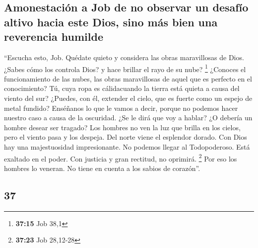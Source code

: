 \begin{paracol}{2}
\hypertarget{amonestaciuxf3n-a-job-de-no-observar-un-desafuxedo-altivo-hacia-este-dios-sino-muxe1s-bien-una-reverencia-humilde}{%
\subsection{Amonestación a Job de no observar un desafío altivo hacia
este Dios, sino más bien una reverencia
humilde}\label{amonestaciuxf3n-a-job-de-no-observar-un-desafuxedo-altivo-hacia-este-dios-sino-muxe1s-bien-una-reverencia-humilde}}

 ``Escucha esto, Job. Quédate quieto y considera las
obras maravillosas de Dios.  ¿Sabes cómo los controla
Dios? y hace brillar el rayo de su nube? \footnote{\textbf{37:15} Job
  38,1}  ¿Conoces el funcionamiento de las nubes, las
obras maravillosas de aquel que es perfecto en el conocimiento?
 Tú, cuya ropa es cálidacuando la tierra está quieta a
causa del viento del sur?  ¿Puedes, con él, extender el
cielo, que es fuerte como un espejo de metal fundido? 
Enséñanos lo que le vamos a decir, porque no podemos hacer nuestro caso
a causa de la oscuridad.  ¿Se le dirá que voy a hablar?
¿O debería un hombre desear ser tragado?  Los hombres no
ven la luz que brilla en los cielos, pero el viento pasa y los despeja.
 Del norte viene el esplendor dorado. Con Dios hay una
majestuosidad impresionante.  No podemos llegar al
Todopoderoso. Está exaltado en el poder. Con justicia y gran rectitud,
no oprimirá. \footnote{\textbf{37:23} Job 28,12-28}  Por
eso los hombres lo veneran. No tiene en cuenta a los sabios de
corazón''.

\switchcolumn
\begin{otherlanguage}{english}

\hypertarget{section-73}{%
\section{37}\label{section-73}}


\end{otherlanguage}
\end{paracol}
